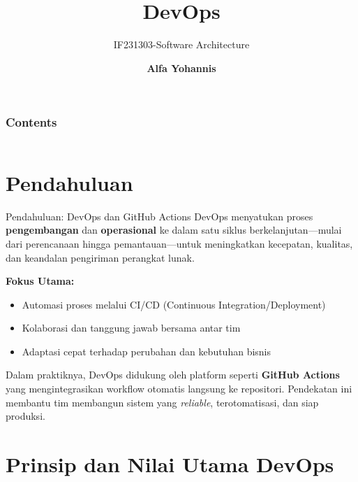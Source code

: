 \documentclass[aspectratio=169, table]{beamer}
\title{\Huge DevOps\\\vspace{30pt}}
\subtitle{IF231303-Software Architecture}
\author{\textbf{Alfa Yohannis}}
\begin{document}
	
	\frame{\titlepage}
	
	
	\begin{frame}[fragile]
		\frametitle{Contents}
		\vspace{20pt}
		\begin{columns}[t]
			\tableofcontents[sections={1-5}]
			
			\tableofcontents[sections={6-10}]
		\end{columns}
	\end{frame}
	
\section{Pendahuluan}

\begin{frame}[fragile]{Pendahuluan: DevOps dan GitHub Actions}
	\vspace{20pt}
	DevOps menyatukan proses \textbf{pengembangan} dan \textbf{operasional} ke dalam satu siklus berkelanjutan—mulai dari perencanaan hingga pemantauan—untuk meningkatkan kecepatan, kualitas, dan keandalan pengiriman perangkat lunak.
	
	\vspace{6pt}
	\textbf{Fokus Utama:}
	\begin{itemize}
		\item Automasi proses melalui CI/CD (Continuous Integration/Deployment)
		\item Kolaborasi dan tanggung jawab bersama antar tim
		\item Adaptasi cepat terhadap perubahan dan kebutuhan bisnis
	\end{itemize}
	
	\vspace{6pt}
	Dalam praktiknya, DevOps didukung oleh platform seperti \textbf{GitHub Actions} yang mengintegrasikan workflow otomatis langsung ke repositori. Pendekatan ini membantu tim membangun sistem yang \textit{reliable}, terotomatisasi, dan siap produksi.
\end{frame}

\section{Prinsip dan Nilai Utama DevOps}
\end{document}
